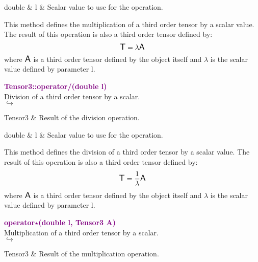 \begin{tcolorbox}[width=\textwidth,myArgs,tabularx={ll|R}]
double & l & Scalar value to use for the operation.
\end{tcolorbox}

This method defines the multiplication of a third order tensor by a scalar value.
The result of this operation is also a third order tensor defined by:
\begin{equation*}
\mbox{\large\ensuremath{\mathsf{T}}} = \lambda \mbox{\large\ensuremath{\mathsf{A}}}
\end{equation*}
where $\mbox{\large\ensuremath{\mathsf{A}}}$ is a third order tensor defined by the object itself and $\lambda$ is the scalar value defined by parameter l.

\textcolor{purple}{\textbf{Tensor3::operator/(double l)}}\label{Tensor3::operator/(double l)}\\
Division of a third order tensor by a scalar.\\ \hspace*{5mm}$\hookrightarrow$
\vspace*{-2em}\begin{tcolorbox}[grow to left by=-1cm, width=\textwidth-1cm,myArgs,tabularx={l|R}]
Tensor3 & Result of the division operation.
\end{tcolorbox}

\begin{tcolorbox}[width=\textwidth,myArgs,tabularx={ll|R}]
double & l & Scalar value to use for the operation.
\end{tcolorbox}

This method defines the division of a third order tensor by a scalar value.
The result of this operation is also a third order tensor defined by:
\begin{equation*}
\mbox{\large\ensuremath{\mathsf{T}}} = \frac{1}{\lambda} \mbox{\large\ensuremath{\mathsf{A}}}
\end{equation*}
where $\mbox{\large\ensuremath{\mathsf{A}}}$ is a third order tensor defined by the object itself and $\lambda$ is the scalar value defined by parameter l.

\textcolor{purple}{\textbf{operator$\star$(double l, Tensor3 A)}}\label{operator*(double l, Tensor3 A)}\\
Multiplication of a third order tensor by a scalar.\\ \hspace*{5mm}$\hookrightarrow$
\vspace*{-2em}\begin{tcolorbox}[grow to left by=-1cm, width=\textwidth-1cm,myArgs,tabularx={l|R}]
Tensor3 & Result of the multiplication operation.
\end{tcolorbox}


